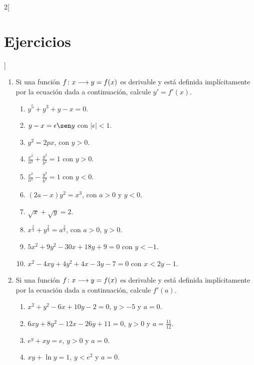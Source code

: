 \begin{multicols}{2}[\section{Ejercicios}]
\begingroup
\small
\begin{enumerate}[leftmargin=*]
\item Si una función $f\colon x\longrightarrow y = f(x)$ es derivable y está definida implícitamente
    por la ecuación dada a continuación, calcule $y' = f'(x)$.
    \begin{enumerate}[leftmargin=*]
    \item $\displaystyle y^5 + y^3 + y - x = 0$.
    \item $\displaystyle y - x = \epsilon\sen y$ con $|\epsilon| < 1$.
    \item $\displaystyle y^2 = 2px$, con $y > 0$.
    \item $\displaystyle \frac{x^2}{a^2} + \frac{y^2}{b^2} = 1$ con $y > 0$.
    \item $\displaystyle \frac{x^2}{a^2} - \frac{y^2}{b^2} = 1$ con $y < 0$.
    \item $\displaystyle (2a - x)y^2 = x^3$, con $a > 0$ y $y < 0$.
    \item $\displaystyle \sqrt{x} + \sqrt{y} = 2$.
    \item $\displaystyle x^{\frac{2}{3}} + y^{\frac{2}{3}} = a^{\frac{2}{3}}$, con $a > 0$,
        $y > 0$.
    \item $\displaystyle 5x^2 + 9y^2 - 30x + 18y + 9 = 0$ con $y < -1$.
    \item $\displaystyle x^2 - 4xy + 4y^2 + 4x - 3y - 7 = 0$ con $x < 2y - 1$.
    \end{enumerate}

\item Si una función $f\colon x\longrightarrow y = f(x)$ es derivable y está definida implícitamente
    por la ecuación dada a continuación, calcule $f'(a)$.
    \begin{enumerate}[leftmargin=*]
    \item $\displaystyle x^2 + y^2 - 6x + 10y - 2 = 0$, $y > - 5$ y $a = 0$.
    \item $\displaystyle 6xy + 8y^2 - 12x - 26y + 11 = 0$, $y > 0$ y $a = \frac{11}{12}$.
    \item $\displaystyle e^y + xy = e$, $y > 0$ y $a = 0$.
    \item $\displaystyle xy + \ln y = 1$, $y < e^2$ y $a = 0$.
    \end{enumerate}
\end{enumerate}
\endgroup
\end{multicols}

